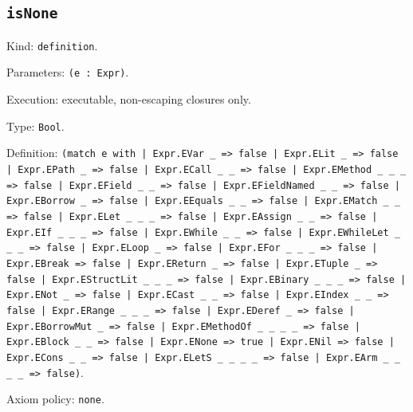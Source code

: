 \documentclass[11pt]{article}
\begin{document}
\subsection*{\texttt{isNone}}
\noindent Kind: \texttt{definition}.\par
\noindent Parameters: \texttt{(e : Expr)}.\par
\noindent Execution: executable, non-escaping closures only.\par
\noindent Type: \texttt{Bool}.\par
\noindent Definition: \texttt{(match e with | Expr.EVar \_ => false | Expr.ELit \_ => false | Expr.EPath \_ => false | Expr.ECall \_ \_ => false | Expr.EMethod \_ \_ \_ => false | Expr.EField \_ \_ => false | Expr.EFieldNamed \_ \_ => false | Expr.EBorrow \_ => false | Expr.EEquals \_ \_ => false | Expr.EMatch \_ \_ => false | Expr.ELet \_ \_ \_ => false | Expr.EAssign \_ \_ => false | Expr.EIf \_ \_ \_ => false | Expr.EWhile \_ \_ => false | Expr.EWhileLet \_ \_ \_ => false | Expr.ELoop \_ => false | Expr.EFor \_ \_ \_ => false | Expr.EBreak => false | Expr.EReturn \_ => false | Expr.ETuple \_ => false | Expr.EStructLit \_ \_ \_ => false | Expr.EBinary \_ \_ \_ => false | Expr.ENot \_ => false | Expr.ECast \_ \_ => false | Expr.EIndex \_ \_ => false | Expr.ERange \_ \_ \_ => false | Expr.EDeref \_ => false | Expr.EBorrowMut \_ => false | Expr.EMethodOf \_ \_ \_ \_ => false | Expr.EBlock \_ \_ => false | Expr.ENone => true | Expr.ENil => false | Expr.ECons \_ \_ => false | Expr.ELetS \_ \_ \_ \_ => false | Expr.EArm \_ \_ \_ \_ => false)}.\par
\noindent Axiom policy: \texttt{none}.\par
\end{document}
